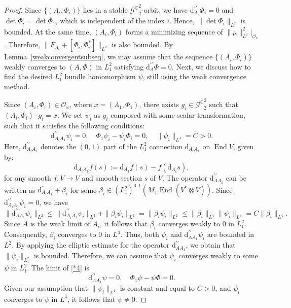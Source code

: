 \documentclass[a4paper]{amsart}
\theoremstyle{definition}
\theoremstyle{remark}
\numberwithin{equation}{section}
\begin{document}
\begin{proof}
Since $\{(A_i, \Phi_i)\}$ lies in a stable ${\mathscr{G}^\mathbb{C}}_2^2$-orbit, we have $\mathrm{d}_{A_i}^{\prime\prime} \Phi_i = 0$ and $\det \Phi_i = \det \Phi_1$, which is independent of the index $i$. Hence, $\|\det \Phi_i\|_{L^2}$ is bounded. At the same time, $(A_i, \Phi_i)$ forms a minimizing sequence of $\|\mu\|_{L^2}^2|_{\mathcal{O}_x}$. Therefore, $\|F_{A_i} + [\Phi_i, \Phi_i^*]\|_{L^2}$ is also bounded. By Lemma~\ref{weakconvergentsubseq}, we may assume that the sequence $\{(A_i, \Phi_i)\}$ weakly converges to $(A, \Phi)$ in $L_1^2$ satisfying $\mathrm{d}_A^{\prime\prime} \Phi = 0$. Next, we discuss how to find the desired $L_1^2$ bundle homomorphism $\psi$, still using the weak convergence method.

Since $(A_i, \Phi_i) \in \mathcal{O}_x$, where $x = (A_1, \Phi_1)$, there exists $g_i \in {\mathscr{G}^\mathbb{C}}^2_2$ such that $(A_i, \Phi_i) \cdot g_i = x$. We set $\psi_i$ as $g_i$ composed with some scalar transformation, such that it satisfies the following conditions:  
\begin{equation}
\mathrm{d}_{A_i A_1}^{\prime\prime} \psi_i = 0, \quad \Phi_1 \psi_i - \psi_i \Phi_i = 0, \quad \|\psi_i\|_{L^4} = C > 0.\label{*4}
\end{equation}
Here, $\mathrm{d}_{A_i A_1}^{\prime\prime}$ denotes the $(0,1)$ part of the $L_1^2$ connection $\mathrm{d}_{A_i A_1}$ on $\operatorname{End} V$, given by:  
\[
\mathrm{d}_{A_i A_1} f(s) := \mathrm{d}_{A_1}f(s) - f(\mathrm{d}_{A_i}s),
\]
for any smooth $f \colon V \to V$ and smooth section $s$ of $V$. The operator $\text{d}_{A A_1}^{\prime\prime}$ can be written as $\text{d}_{A_i A_1}^{\prime\prime} + \beta_i$ for some $\beta_i \in (L_1^2)^{0,1}(M, \operatorname{End}(V^* \otimes V))$. Since $\text{d}_{A_i A_1}^{\prime\prime} \psi_i = 0$, we have 
\[
\|\text{d}_{A A_1}^{\prime\prime} \psi_i\|_{L^2} \leq \|\text{d}_{A_i A_1}^{\prime\prime} \psi_i\|_{L^2}+\|\beta_i \psi_i\|_{L^2}=\|\beta_i \psi_i\|_{L^2} \leq \|\beta_i\|_{L^4} \|\psi_i\|_{L^4}=C\|\beta_i\|_{L^4}. 
\]
Since $A$ is the weak limit of $A_i$, it follows that $\beta_i$ converges weakly to $0$ in $L_1^2$. Consequently, $\beta_i$ converges to $0$ in $L^4$. Thus, both $\psi_i$ and $\mathrm{d}_{A A_1}^{\prime\prime} \psi_i$ are bounded in $L^2$. By applying the elliptic estimate for the operator $\mathrm{d}_{A A_1}^{\prime\prime}$, we obtain that $\|\psi_i\|_{L_1^2}$ is bounded. Therefore, we can assume that $\psi_i$ converges weakly to some $\psi$ in $L_1^2$. The limit of \eqref{*4} is
\[
\mathrm{d}_{A A_1}^{\prime\prime} \psi = 0, \quad \Phi_1 \psi - \psi \Phi = 0.
\]
Given our assumption that $\|\psi_i\|_{L^4}$ is constant and equal to $C > 0$, and $\psi_i$ converges to $\psi$ in $L^4$, it follows that $\psi \neq 0$.
\end{proof}
\end{document}
